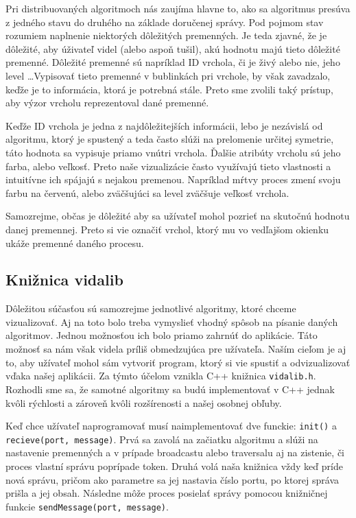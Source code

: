 Pri distribuovaných algoritmoch nás zaujíma hlavne to, ako sa algoritmus presúva z jedného stavu do
druhého na základe doručenej správy. Pod pojmom stav rozumiem naplnenie niektorých dôležitých
premenných. Je teda zjavné, že je dôležité, aby úživateľ videl (alebo aspoň tušil), akú hodnotu majú
tieto dôležité premenné. Dôležité premenné sú napríklad ID vrchola, či je živý alebo nie, jeho
level \dots Vypisovať tieto premenné v bublinkách pri vrchole, by však zavadzalo, keďže je to
informácia, ktorá je potrebná stále. Preto sme zvolili taký prístup, aby výzor vrcholu reprezentoval
dané premenné.

Keďže ID vrchola je jedna z najdôležitejších informácii, lebo je nezávislá od algoritmu, ktorý je
spustený a teda často slúži na prelomenie určitej symetrie, táto hodnota sa vypisuje priamo vnútri
vrchola. Ďalšie atribúty vrcholu sú jeho farba, alebo veľkosť. Preto naše vizualizácie často
využívajú tieto vlastnosti a intuitívne ich spájajú s nejakou premenou. Napríklad mŕtvy proces zmení
svoju farbu na červenú, alebo zväčšujúci sa level zväčšuje veľkosť vrchola.

Samozrejme, občas je dôležité aby sa užívateľ mohol pozrieť na skutočnú hodnotu danej premennej.
Preto si vie označiť vrchol, ktorý mu vo vedľajšom okienku ukáže premenné daného procesu.

\subsection{Knižnica vidalib}

Dôležitou súčasťou sú samozrejme jednotlivé algoritmy, ktoré chceme vizualizovať. Aj na toto bolo
treba vymyslieť vhodný spôsob na písanie daných algoritmov. Jednou možnosťou ich bolo priamo zahrnúť
do aplikácie. Táto možnosť sa nám však videla príliš obmedzujúca pre užívateľa. Naším cieľom je aj
to, aby užívateľ mohol sám vytvoriť program, ktorý si vie spustiť a odvizualizovať vďaka našej
aplikácii. Za týmto účelom vznikla C++ knižnica \verb!vidalib.h!. Rozhodli sme sa, že samotné
algoritmy sa budú implementovať v C++ jednak kvôli rýchlosti a zároveň kvôli rozšírenosti a našej
osobnej obľuby.

Keď chce užívateľ naprogramovať musí naimplementovať dve funckie: \verb!init()! a
\verb!recieve(port, message)!. Prvá sa zavolá na začiatku algoritmu a slúži na nastavenie premenných
a v prípade broadcastu alebo traversalu aj na zistenie, či proces vlastní správu poprípade token.
Druhá volá naša knižnica vždy keď príde nová správu, pričom ako parametre sa jej nastavia číslo
portu, po ktorej správa prišla a jej obsah. Následne môže proces posielať správy pomocou knižničnej
funkcie \verb!sendMessage(port, message)!.

